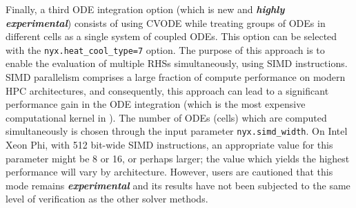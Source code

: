 Finally, a third ODE integration option (which is new and \emph{\textbf{highly experimental}}) consists of using CVODE while treating groups of ODEs in different cells as a single system of coupled ODEs.
This option can be selected with the \texttt{nyx.heat\_cool\_type=7} option.
The purpose of this approach is to enable the evaluation of multiple RHSs simultaneously, using SIMD instructions.
SIMD parallelism comprises a large fraction of compute performance on modern HPC architectures, and consequently, this approach can lead to a significant performance gain in the ODE integration (which is the most expensive computational kernel in \nyx).
The number of ODEs (cells) which are computed simultaneously is chosen through the input parameter \texttt{nyx.simd\_width}.
On Intel Xeon Phi, with 512 bit-wide SIMD instructions, an appropriate value for this parameter might be 8 or 16, or perhaps larger; the value which yields the highest performance will vary by architecture.
However, users are cautioned that this mode remains \emph{\textbf{experimental}} and its results have not been subjected to the same level of verification as the other solver methods.
